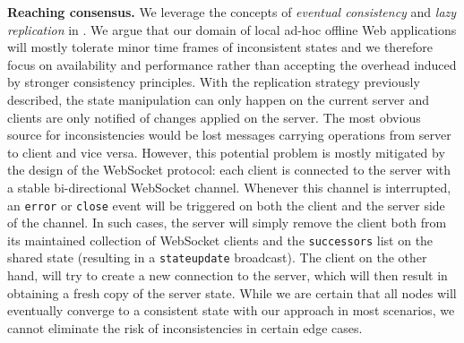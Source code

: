 \textbf{Reaching consensus.}
We leverage the concepts of \textit{eventual consistency} and \textit{lazy replication} in \APIshort.
We argue that our domain of local ad-hoc offline Web applications will mostly tolerate minor time frames of inconsistent states and we therefore focus on availability and performance rather than accepting the overhead induced by stronger consistency principles.
With the replication strategy previously described, the state manipulation can only happen on the current server and clients are only notified of changes applied on the server.
The most obvious source for inconsistencies would be lost messages carrying operations from server to client and vice versa.
However, this potential problem is mostly mitigated by the design of the WebSocket protocol: each client is connected to the server with a stable bi-directional WebSocket channel. 
Whenever this channel is interrupted, an \texttt{error} or \texttt{close} event will be triggered on both the client and the server side of the channel.
In such cases, the server will simply remove the client both from its maintained collection of WebSocket clients and the \texttt{successors} list on the shared state (resulting in a \texttt{stateupdate} broadcast). 
The client on the other hand, will try to create a new connection to the server, which will then result in obtaining a fresh copy of the server state.
While we are certain that all nodes will eventually converge to a consistent state with our approach in most scenarios, we cannot eliminate the risk of inconsistencies in certain edge cases.